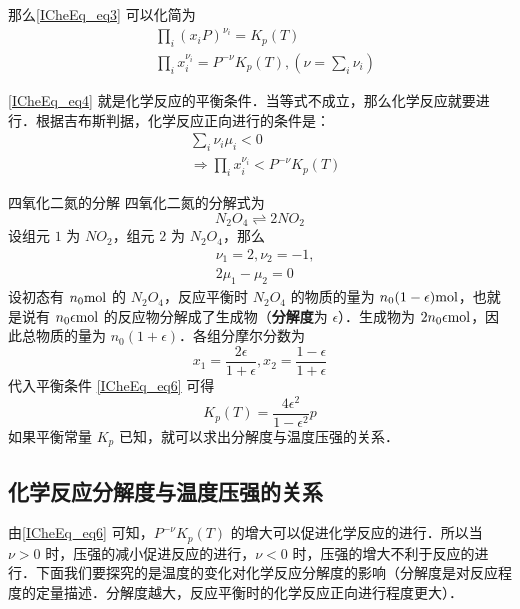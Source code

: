 那么\autoref{ICheEq_eq3} 可以化简为
\begin{equation}\label{ICheEq_eq4}
\begin{aligned}
&\prod_i (x_iP)^{\nu_i}=K_p(T)\\
&\prod_i x_i^{\nu_i}=P^{-\nu} K_p(T),(\nu=\sum_i\nu_i)
\end{aligned}
\end{equation}

\autoref{ICheEq_eq4} 就是化学反应的平衡条件．当等式不成立，那么化学反应就要进行．根据吉布斯判据，化学反应正向进行的条件是：
\begin{equation}\label{ICheEq_eq6}
\begin{aligned}
&\sum_i \nu_i\mu_i<0\\
&\Rightarrow \prod_i x_i^{\nu_i}<P^{-\nu}K_p(T)
\end{aligned}
\end{equation}

\begin{example}{四氧化二氮的分解}\label{ICheEq_ex1}
四氧化二氮的分解式为
\begin{equation}
N_2O_4\rightleftharpoons 2NO_2
\end{equation}
设组元 $1$ 为 $NO_2$，组元 $2$ 为 $N_2O_4$，那么
\begin{equation}
\begin{aligned}
&\nu_1=2,\nu_2=-1,\\
&2\mu_1-\mu_2=0
\end{aligned}
\end{equation}
设初态有 $n_0 \rm{mol}$ 的 $N_2O_4$，反应平衡时 $N_2O_4$ 的物质的量为 $n_0(1-\epsilon) \rm{mol}$，也就是说有 $n_0 \epsilon \rm{mol}$ 的反应物分解成了生成物（\textbf{分解度}为 $\epsilon$）．生成物为 $2n_0\epsilon \rm{mol}$，因此总物质的量为 $n_0(1+\epsilon)$．各组分摩尔分数为
\begin{equation}
x_1=\frac{2\epsilon}{1+\epsilon},x_2=\frac{1-\epsilon}{1+\epsilon}
\end{equation}
代入平衡条件 \autoref{ICheEq_eq6} 可得
\begin{equation}
K_p(T)=\frac{4\epsilon^2}{1-\epsilon^2}p
\end{equation}
如果平衡常量 $K_p$ 已知，就可以求出分解度与温度压强的关系．
\end{example}


\subsection{化学反应分解度与温度压强的关系}
由\autoref{ICheEq_eq6} 可知，$P^{-\nu}K_p(T)$ 的增大可以促进化学反应的进行．所以当 $\nu>0$ 时，压强的减小促进反应的进行，$\nu<0$ 时，压强的增大不利于反应的进行．下面我们要探究的是温度的变化对化学反应分解度的影响（分解度是对反应程度的定量描述．分解度越大，反应平衡时的化学反应正向进行程度更大）．

